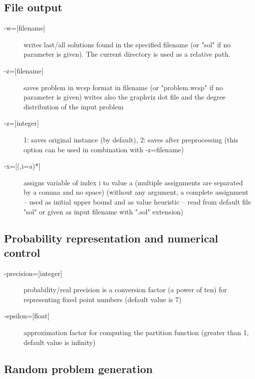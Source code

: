 \documentclass{article}
\begin{document}
\subsection{File output}

\begin{description}
\item[{-w=[filename]}] writes last/all solutions found in the specified
  filename (or "sol" if no parameter is given). The current directory
  is used as a relative path.
\item[{-z=[filename]}]  saves problem in wcsp format in filename (or
  "problem.wcsp" if no parameter is given) writes also the graphviz
  dot file and the degree distribution of the input problem
\item[{-z=[integer]}] 1: saves original instance (by default), 2: saves
  after preprocessing (this option can be used in combination with -z=filename)
\item[{-x=[(,i=a)*]}] assigns variable of index i to value a (multiple
  assignments are separated by a comma and no space) (without any
  argument, a complete assignment -- used as initial upper bound and
  as value heuristic -- read from default file "sol" or given as input
  filename with ".sol" extension)
\end{description}

\subsection{Probability representation and numerical control}

\begin{description}
\item[{-precision=[integer]}] probability/real precision is a conversion
  factor (a power of ten) for representing fixed point numbers
  (default value is 7)
\item[{-epsilon=[float]}] approximation factor for computing the partition
  function (greater than 1, default value is infinity)
\end{description}
 
\subsection{Random problem generation}
\end{document}
